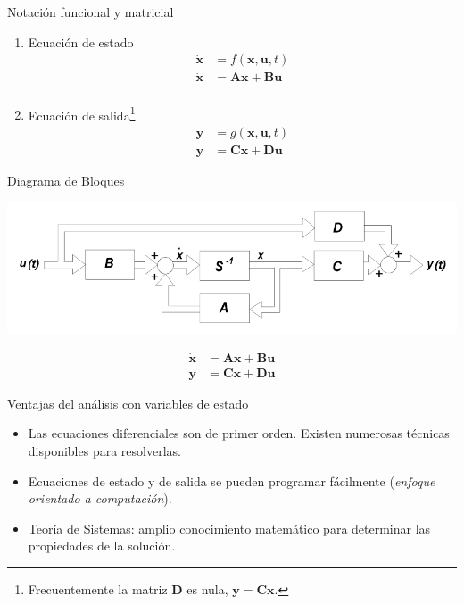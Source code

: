 {Notación funcional y matricial}

\begin{enumerate}
\item Ecuación de estado
\label{sec:org5578cd7}
\begin{align*}
\dot{\mathbf{x}} &= f(\mathbf{x}, \mathbf{u}, t)\\
\dot{\mathbf{x}} &= \mathbf{A}\mathbf{x} + \mathbf{B}\mathbf{u}\\
\end{align*}

\item Ecuación de salida\footnote{Frecuentemente la matriz \(\mathbf{D}\) es nula, \(\mathbf{y} = \mathbf{C}\mathbf{x}\).}
\label{sec:org914aaec}
\begin{align*}
\mathbf{y} &= g(\mathbf{x}, \mathbf{u}, t)\\
\mathbf{y} &= \mathbf{C}\mathbf{x} + \mathbf{D}\mathbf{u} 
\end{align*}
\end{enumerate}

{Diagrama de Bloques}

\begin{center}
\includegraphics[width=.9\linewidth]{../figs/Bloques_Variables_Estado.pdf}
\end{center}

\begin{align*}
  \dot{\mathbf{x}} &= \mathbf{A}\mathbf{x} + \mathbf{B}\mathbf{u}\\
  \mathbf{y} &= \mathbf{C}\mathbf{x} + \mathbf{D}\mathbf{u} 
\end{align*}

{Ventajas del análisis con variables de estado}

\begin{itemize}
\item Las ecuaciones diferenciales son de primer orden. Existen numerosas técnicas disponibles para resolverlas.
\item Ecuaciones de estado y de salida se pueden programar fácilmente (\emph{enfoque orientado a computación}).
\item Teoría de Sistemas: amplio conocimiento matemático para determinar las propiedades de la solución.
\end{itemize}

